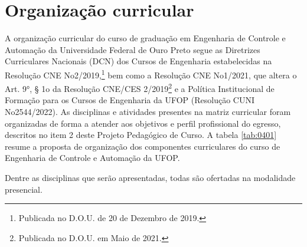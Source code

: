 \documentclass[
	12pt,				%
	openright,			%
	oneside,			%
	a4paper,			%
	english,			%
	brazil				%
	]{abntex2}
\begin{document}
\chapter{Organização curricular}
\label{cap:04} 
%
A organização curricular do curso de graduação em Engenharia de Controle e Automação da Universidade Federal de Ouro Preto segue as Diretrizes Curriculares Nacionais (DCN) dos Cursos de Engenharia estabelecidas na Resolução CNE No2/2019,\footnote{Publicada no D.O.U. de 20 de Dezembro de 2019.} bem como a Resolução CNE No1/2021, que altera o Art. 9°, § 1o da Resolução CNE/CES 2/2019\footnote{Publicada no D.O.U. em Maio de 2021.} e a Política Institucional de Formação para os Cursos de Engenharia da UFOP (Resolução CUNI No2544/2022). As disciplinas e atividades presentes na matriz curricular foram organizadas de forma a atender aos objetivos e perfil profissional do egresso, descritos no item 2 deste Projeto Pedagógico de Curso. A tabela \ref{tab:0401} resume a proposta de organização dos componentes curriculares do curso de Engenharia de Controle e Automação da UFOP.
%
\begin{table}[ht]
	\caption{Organização dos Componentes curriculares}
	\label{tab:0401}
\end{table}

Dentre as disciplinas que serão apresentadas, todas são ofertadas na modalidade presencial.
\end{document}
